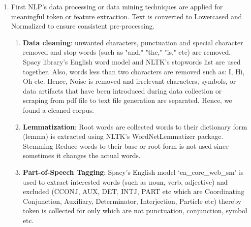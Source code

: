 \documentclass[sn-mathphys,Numbered]{sn-jnl}%
\theoremstyle{thmstyleone}%
\theoremstyle{thmstyletwo}%
\theoremstyle{thmstylethree}%
\begin{document}
\begin{enumerate}
\def\labelenumi{\alph{enumi}.}
\item
  First NLP's data processing or data mining techniques are applied for meaningful token or feature extraction. Text is converted to Lowercased and Normalized to ensure consistent pre-processing.

  \begin{enumerate}
  \def\labelenumii{\roman{enumii}.}
  \item
    \textbf{Data cleaning}: unwanted characters, punctuation and special
    character removed and stop words (such as "and," "the," "is," etc)
    are removed. Spacy library's English word model and NLTK's stopwords
    list are used together. Also, words less than two characters are
    removed such as: I, Hi, Oh etc. Hence, Noise is removed and
    irrelevant characters, symbols, or data artifacts that have been
    introduced during data collection or scraping from pdf file to text
    file generation are separated. Hence, we found a cleaned corpus.
  \item
    \textbf{Lemmatization}: Root words are collected words to their dictionary
    form (lemma) is extracted using NLTK's WordNetLemmatizer package.
    Stemming Reduce words to their base or root form is not used since
    sometimes it changes the actual words.
  \item
    \textbf{Part-of-Speech Tagging}: Spacy's English model `en\_core\_web\_sm' is
    used to extract interested words (such as noun, verb, adjective) and
    excluded (CCONJ, AUX, DET, INTJ, PART etc which are Coordinating
    Conjunction, Auxiliary, Determinator, Interjection, Particle etc)
    thereby token is collected for only which are not punctuation,
    conjunction, symbol etc.
  \end{enumerate}
\end{enumerate}
\end{document}

